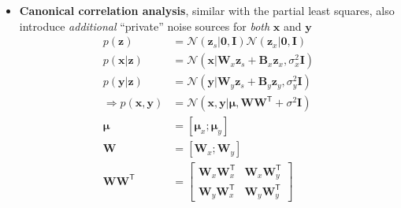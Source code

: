\begin{itemize}
    \item \textbf{Canonical correlation analysis}, similar with the partial least squares, also introduce \textit{additional} ``private'' noise sources for \textit{both} $\bm{x}$ and $\bm{y}$
    \begin{align}
        p(\bm{z})
        & = \mathcal{N}(\bm{z}_s|\mathbf{0},\mathbf{I})\mathcal{N}(\bm{z}_x|\mathbf{0},\mathbf{I}) \\
        p(\bm{x}|\bm{z})
        & = \mathcal{N}(\bm{x}|\mathbf{W}_x\bm{z}_s+\mathbf{B}_x\bm{z}_x,\sigma_x^2\mathbf{I}) \\
        p(\bm{y}|\bm{z})
        & = \mathcal{N}(\bm{y}|\mathbf{W}_y\bm{z}_s+\mathbf{B}_y\bm{z}_y,\sigma_y^2\mathbf{I}) \\
        \Rightarrow p(\bm{x},\bm{y}) 
        & = \mathcal{N}(\bm{x},\bm{y}|\bm{\mu},\mathbf{WW}^\mathsf{T} + \sigma^2\mathbf{I}) \\
        \bm{\mu}
        & = [\bm{\mu}_x;\bm{\mu}_y] \\
        \mathbf{W}
        & = \left[\mathbf{W}_x;\mathbf{W}_y\right] \\
        \mathbf{WW}^\mathsf{T}
        & = \begin{bmatrix}
            \mathbf{W}_x\mathbf{W}_x^\mathsf{T} & \mathbf{W}_x\mathbf{W}_y^\mathsf{T} \\
            \mathbf{W}_y\mathbf{W}_x^\mathsf{T} & \mathbf{W}_y\mathbf{W}_y^\mathsf{T}
        \end{bmatrix}
    \end{align}
\end{itemize}



